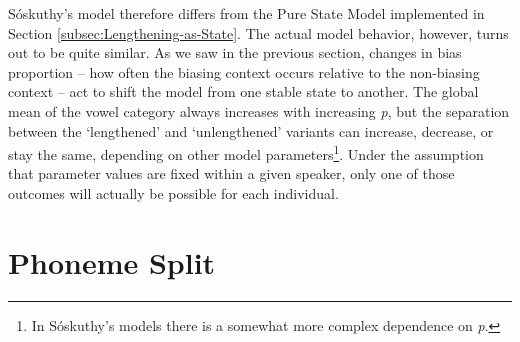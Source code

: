 Sóskuthy's model therefore differs from the Pure State Model implemented
in Section \ref{subsec:Lengthening-as-State}. The actual model behavior,
however, turns out to be quite similar. As we saw in the previous
section, changes in bias proportion – how often the biasing context
occurs relative to the non-biasing context – act to shift the model
from one stable state to another. The global mean of the vowel category
always increases with increasing \emph{p}, but the separation between
the `lengthened' and `unlengthened' variants can increase, decrease,
or stay the same, depending on other model parameters\footnote{In Sóskuthy's models there is a somewhat more complex dependence on
\emph{p}. }. Under the assumption that parameter values are fixed within a given
speaker, only one of those outcomes will actually be possible for
each individual. 

\section{\label{subsec:Phoneme-Split}Phoneme Split}

